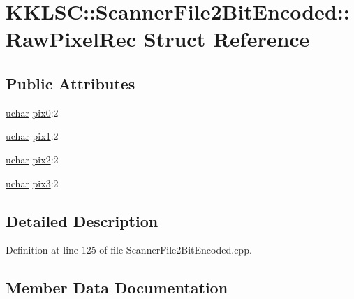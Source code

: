 \hypertarget{struct_scanner_file2_bit_encoded_1_1_raw_pixel_rec}{}\section{K\+K\+L\+SC\+:\+:Scanner\+File2\+Bit\+Encoded\+:\+:Raw\+Pixel\+Rec Struct Reference}
\label{struct_scanner_file2_bit_encoded_1_1_raw_pixel_rec}
\subsection*{Public Attributes}
\begin{DoxyCompactItemize}
\item 
\hyperlink{namespace_k_k_b_ace9969169bf514f9ee6185186949cdf7}{uchar} \hyperlink{struct_scanner_file2_bit_encoded_1_1_raw_pixel_rec_a7aa3d1294795e174e035d2962ccc01fe}{pix0}\+:2
\item 
\hyperlink{namespace_k_k_b_ace9969169bf514f9ee6185186949cdf7}{uchar} \hyperlink{struct_scanner_file2_bit_encoded_1_1_raw_pixel_rec_a6e2c3b2592e06b670f71e6f774286a4a}{pix1}\+:2
\item 
\hyperlink{namespace_k_k_b_ace9969169bf514f9ee6185186949cdf7}{uchar} \hyperlink{struct_scanner_file2_bit_encoded_1_1_raw_pixel_rec_adbf569ee8c4c1449336ec669b7dd7c6c}{pix2}\+:2
\item 
\hyperlink{namespace_k_k_b_ace9969169bf514f9ee6185186949cdf7}{uchar} \hyperlink{struct_scanner_file2_bit_encoded_1_1_raw_pixel_rec_ac9797ff0f134a3b228043abb3c00a4d4}{pix3}\+:2
\end{DoxyCompactItemize}


\subsection{Detailed Description}


Definition at line 125 of file Scanner\+File2\+Bit\+Encoded.\+cpp.



\subsection{Member Data Documentation}
